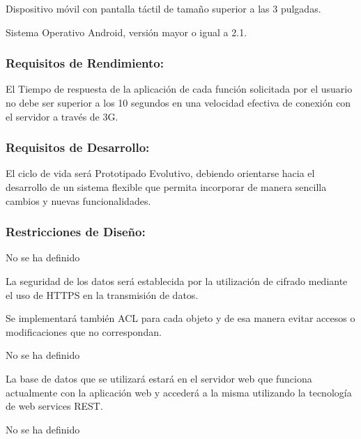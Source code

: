             Dispositivo móvil con pantalla táctil de tamaño superior a las 3 pulgadas.
            
            
            Sistema Operativo Android, versión mayor o igual a 2.1.
            
        \subsubsection{Requisitos de Rendimiento:}
        
        El Tiempo de respuesta de la aplicación de cada función solicitada por el usuario no debe ser superior a los  10 segundos en una velocidad efectiva de conexión con el servidor a través de 3G.
        
        \subsubsection{Requisitos de Desarrollo:}
        
        El ciclo de vida será Prototipado Evolutivo, debiendo orientarse hacia el desarrollo de un sistema flexible que permita incorporar de manera sencilla cambios y nuevas funcionalidades.
        
       \subsubsection{Restricciones de Diseño:}
       
         No se ha definido
        
        
        La seguridad de los datos será establecida por la utilización de cifrado mediante el uso de HTTPS en la transmisión de datos.
        
Se implementará también ACL para cada objeto y de esa manera evitar accesos o modificaciones que no correspondan.

        
        No se ha definido 
        
        
        La base de datos que se utilizará estará en el servidor web que funciona actualmente con la aplicación web y accederá a la misma utilizando la tecnología de web services REST.
        
        
        No se ha definido
        

\setcounter{secnumdepth}{-1}



